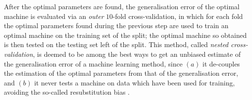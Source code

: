 After the optimal parameters are found, the generalisation error of the optimal machine
is evaluated via an \emph{outer} $10$-fold cross-validation,
in which for each fold the optimal parameters found during the previous step
are used to train an optimal machine on the training set of the split; the optimal
machine so obtained is then tested on the testing set left of the split.
This method, called \emph{nested cross-validation},
is deemed to be among the best ways to get an unbiased estimate of the generalisation
error of a machine learning method, since $(a)$ it de-couples the estimation of the
optimal parameters from that of the generalisation error, and $(b)$ it never tests
a machine on data which have been used for training, avoiding the so-called
resubstitution bias \cite{nestedCV}.
